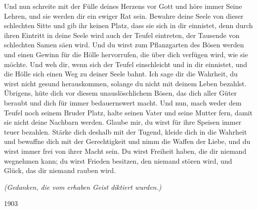 Und nun schreite mit der Fülle deines Herzens vor Gott und höre immer Seine Lehren, und sie werden dir ein ewiger Rat sein. Bewahre deine Seele von dieser schlechten Sitte und gib ihr keinen Platz, dass sie sich in dir einnistet, denn durch ihren Eintritt in deine Seele wird auch der Teufel eintreten, der Tausende von schlechten Samen säen wird. Und du wirst zum Pflanzgarten des Bösen werden und einen Gewinn für die Hölle hervorrufen, die über dich verfügen wird, wie sie möchte. Und weh dir, wenn sich der Teufel einschleicht und in dir einnistet, und die Hölle sich einen Weg zu deiner Seele bahnt. Ich sage dir die Wahrheit, du wirst nicht gesund herauskommen, solange du nicht mit deinem Leben bezahlst. Übrigens, hüte dich vor diesem unauslöschlichem Bösen, das dich aller Güter beraubt und dich für immer bedauernswert macht. Und nun, mach weder dem Teufel noch seinem Bruder Platz, halte seinen Vater und seine Mutter fern, damit sie nicht deine Nachbarn werden. Glaube mir, du wirst für ihre Speisen immer teuer bezahlen. Stärke dich deshalb mit der Tugend, kleide dich in die Wahrheit und bewaffne dich mit der Gerechtigkeit und nimm die Waffen der Liebe, und du wirst immer frei von ihrer Macht sein. Du wirst Freiheit haben, die dir niemand wegnehmen kann; du wirst Frieden besitzen, den niemand stören wird, und Glück, das dir niemand rauben wird.


\textit{	(Gedanken, die vom erhaben Geist diktiert wurden.) }

1903
